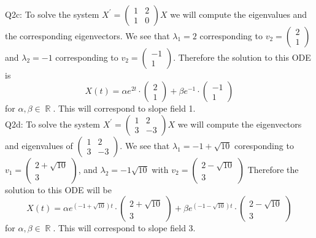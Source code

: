 \documentclass[letterpaper]{article}
\DeclareMathOperator{\R}{\mathbb{R}}
\begin{document}
\newline \\ Q2c: To solve the system $X^\prime = \begin{pmatrix}
    1 & 2 \\ 1 & 0
\end{pmatrix}X$ we will compute the eigenvalues and the corresponding eigenvectors. We see that $\lambda_1=2$ corresponding to $v_2=\begin{pmatrix}
    2\\1
\end{pmatrix}$ and $\lambda_2= -1$ corresponding to $v_2 = \begin{pmatrix}
    -1\\1
\end{pmatrix}$. Therefore the solution to this ODE is $$X(t) = \alpha e^{2t}\cdot \begin{pmatrix}
    2\\1
\end{pmatrix} + \beta e^{-1} \cdot \begin{pmatrix}
    -1 \\ 1
\end{pmatrix}$$ for $\alpha,\beta\in \R$. This will correspond to slope field 1. 
\newline \\ Q2d: To solve the system $X^\prime = \begin{pmatrix}
    1 & 2 \\ 3& -3
\end{pmatrix}X$ we will compute the eigenvectors and eigenvalues of $\begin{pmatrix}
    1 & 2 \\ 3& -3
\end{pmatrix}$. We see that $\lambda_1 = -1 + \sqrt{10}$ coresponding to $v_1=\begin{pmatrix}
    2+ \sqrt{10}\\3
\end{pmatrix}$, and $\lambda_2=-1\sqrt{10}$ with $v_2=\begin{pmatrix}
    2-\sqrt{10}\\3
\end{pmatrix}$ Therefore the solution to this ODE will be $$X(t)= \alpha e^{(-1+\sqrt{10})t}\cdot \begin{pmatrix}
    2+\sqrt{10}\\ 3
\end{pmatrix} + \beta e^{(-1-\sqrt{10})t}\cdot \begin{pmatrix}
    2-\sqrt{10}\\ 3
\end{pmatrix}$$ for $\alpha,\beta\in \R$. This will correspond to slope field 3. 
\end{document}
